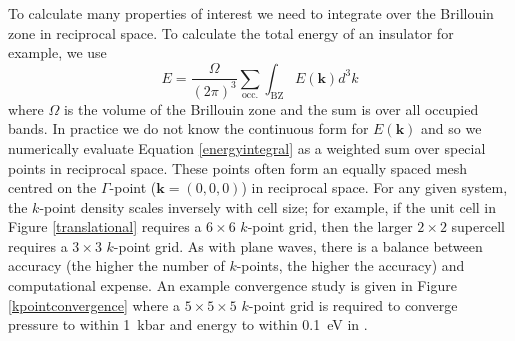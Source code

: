 To calculate many properties of interest we need to integrate over the Brillouin zone in reciprocal space. To calculate the total energy of an insulator for example, we use
\begin{equation} \label{energyintegral}
    E = \frac{\Omega}{(2\pi)^3}\sum_\textrm{occ.}\int_\textrm{BZ}E(\textbf{k})d^3k
\end{equation}
where $\Omega$ is the volume of the Brillouin zone and the sum is over all occupied bands. 
In practice we do not know the continuous form for $E(\textbf{k})$ and so we numerically evaluate Equation \ref{energyintegral} as a weighted sum over special points in reciprocal space. These points often form an equally spaced mesh centred on the $\Gamma$-point ($\textbf{k}=(0,0,0)$) in reciprocal space. For any given system, the $k$-point density scales inversely with cell size; for example, if the unit cell in Figure \ref{translational} requires a $6\times6$ $k$-point grid, then the larger $2\times2$ supercell requires a $3\times3$ $k$-point grid. As with plane waves, there is a balance between accuracy (the higher the number of $k$-points, the higher the accuracy) and computational expense. An example convergence study is given in Figure \ref{kpointconvergence} where a $5\times5\times5$ $k$-point grid is required to converge pressure to within \SI{1}{\kilo\bar} and energy to within \SI{0.1}{\electronvolt} in .




